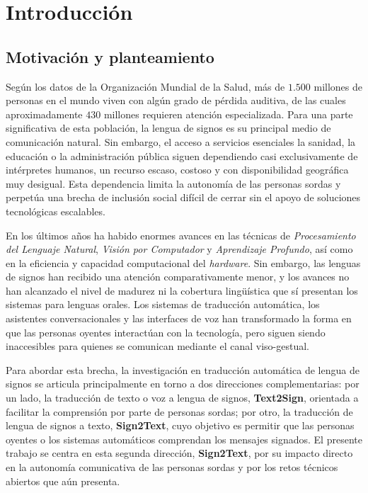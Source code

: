 \chapter{Introducción}

\section{Motivación y planteamiento}
Según los datos de la Organización Mundial de la Salud, más de $1.500$ millones de personas en el mundo viven con algún grado de pérdida auditiva, de las cuales aproximadamente $430$ millones requieren atención especializada.
Para una parte significativa de esta población, la lengua de signos es su principal medio de comunicación natural.
Sin embargo, el acceso a servicios esenciales la sanidad, la educación o la administración pública siguen dependiendo casi exclusivamente de intérpretes humanos, un recurso escaso, costoso y con disponibilidad geográfica muy desigual. Esta dependencia limita la autonomía de las personas sordas y perpetúa una brecha de inclusión social difícil de cerrar sin el apoyo de soluciones tecnológicas escalables.

En los últimos años ha habido enormes avances en las técnicas de \textit{Procesamiento del Lenguaje Natural}, \textit{Visión por Computador} y \textit{Aprendizaje Profundo}, así como en la eficiencia y capacidad computacional del \textit{hardware}.
Sin embargo, las lenguas de signos han recibido una atención comparativamente menor, y los avances no han alcanzado el nivel de madurez ni la cobertura lingüística que sí presentan los sistemas para lenguas orales.
Los sistemas de traducción automática, los asistentes conversacionales y las interfaces de voz han transformado la forma en que las personas oyentes interactúan con la tecnología, pero siguen siendo inaccesibles para quienes se comunican mediante el canal viso-gestual.

Para abordar esta brecha, la investigación en traducción automática de lengua de signos se articula principalmente en torno a dos direcciones complementarias: por un lado, la traducción de texto o voz a lengua de signos, \textbf{Text2Sign}, orientada a facilitar la comprensión por parte de personas sordas; por otro, la traducción de lengua de signos a texto, \textbf{Sign2Text}, cuyo objetivo es permitir que las personas oyentes o los sistemas automáticos comprendan los mensajes signados.
El presente trabajo se centra en esta segunda dirección, \textbf{Sign2Text}, por su impacto directo en la autonomía comunicativa de las personas sordas y por los retos técnicos abiertos que aún presenta.

